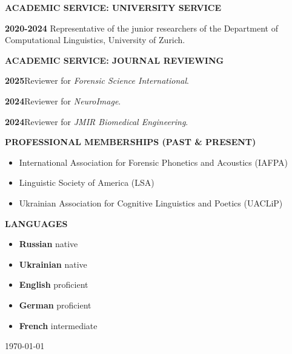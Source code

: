 \documentclass[11pt]{article}
\newcommand{\hangpara}{
 \setlength{\parindent}{0in} %
 \hangindent=0.42in %
}
\begin{document}
\vskip 20pt
\begin{flushleft}
{\bf ACADEMIC SERVICE: UNIVERSITY SERVICE}
\end{flushleft}
\hangpara
{\bf 2020-2024}\hspace{1ex} Representative of the junior researchers of the Department of Computational Linguistics, University of Zurich.




\vskip 20pt
\begin{flushleft}
{\bf ACADEMIC SERVICE: JOURNAL REVIEWING}
\end{flushleft}
\hangpara
{\bf 2025}\hspace{1ex}Reviewer for \textit{Forensic Science International}.
\vskip 6pt
\hangpara
{\bf 2024}\hspace{1ex}Reviewer for \textit{NeuroImage}.
\vskip 6pt
\hangpara
{\bf 2024}\hspace{1ex}Reviewer for \textit{JMIR Biomedical Engineering}.



\vskip 20pt
\begin{flushleft}
{\bf PROFESSIONAL MEMBERSHIPS (PAST \& PRESENT)}
\end{flushleft}
\begin{itemize}
\item International Association for Forensic Phonetics and Acoustics (IAFPA)
\item Linguistic Society of America (LSA)
\item Ukrainian Association for Cognitive Linguistics and Poetics (UACLiP)
\end{itemize}



\vskip 10pt
\begin{flushleft}
{\bf LANGUAGES}
\end{flushleft}
\begin{itemize}
\item {\bf Russian} native
\item {\bf Ukrainian} native
\item {\bf English} proficient
\item {\bf German} proficient
\item {\bf French} intermediate
\end{itemize}

\vskip 20pt
\today
\end{document}
